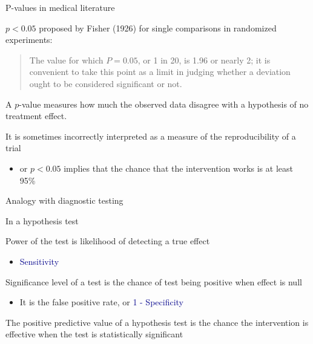 \documentclass[ignorenonframetext,]{beamer}
\providecommand{\tightlist}{%
  \setlength{\itemsep}{0pt}\setlength{\parskip}{0pt}}
\begin{document}
\begin{frame}{P-values in medical literature}
\protect\hypertarget{p-values-in-medical-literature}{}

\(p < 0.05\) proposed by Fisher (1926) for single comparisons in
randomized experiments:

\begin{quote}

The value for which $P = 0.05$, or 1 in 20, is 1.96 or nearly 2; it is convenient to take this point as a limit in judging whether a deviation ought to be considered significant or not. 

\end{quote}

A \(p\)-value measures how much the observed data disagree with a
hypothesis of no treatment effect.

It is sometimes incorrectly interpreted as a measure of the
reproducibility of a trial

\begin{itemize}
\tightlist
\item
  or \(p < 0.05\) implies that the chance that the intervention works is
  at least 95\%
\end{itemize}

\end{frame}

\begin{frame}{Analogy with diagnostic testing}
\protect\hypertarget{analogy-with-diagnostic-testing}{}

In a hypothesis test

Power of the test is likelihood of detecting a true effect

\begin{itemize}
\tightlist
\item
  \textcolor{darkblue}{Sensitivity}
\end{itemize}

Significance level of a test is the chance of test being positive when
effect is null

\begin{itemize}
\tightlist
\item
  It is the false positive rate, or
  \textcolor{darkblue}{1 - Specificity}
\end{itemize}

The positive predictive value of a hypothesis test is the chance the
intervention is effective when the test is statistically significant

\end{frame}
\end{document}

